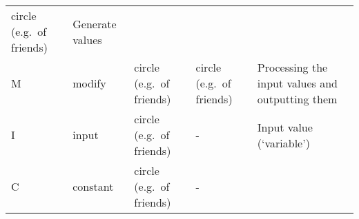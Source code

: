 \begin{longtable}[]{@{}lllll@{}}
\begin{minipage}[t]{0.17\columnwidth}
circle (e.g.~of friends)\strut
\end{minipage} & \begin{minipage}[t]{0.17\columnwidth}\raggedright
Generate values\strut
\end{minipage}\tabularnewline
\begin{minipage}[t]{0.17\columnwidth}\raggedright
M\strut
\end{minipage} & \begin{minipage}[t]{0.17\columnwidth}\raggedright
modify\strut
\end{minipage} & \begin{minipage}[t]{0.17\columnwidth}\raggedright
circle (e.g.~of friends)\strut
\end{minipage} & \begin{minipage}[t]{0.17\columnwidth}\raggedright
circle (e.g.~of friends)\strut
\end{minipage} & \begin{minipage}[t]{0.17\columnwidth}\raggedright
Processing the input values and outputting them\strut
\end{minipage}\tabularnewline
\begin{minipage}[t]{0.17\columnwidth}\raggedright
I\strut
\end{minipage} & \begin{minipage}[t]{0.17\columnwidth}\raggedright
input\strut
\end{minipage} & \begin{minipage}[t]{0.17\columnwidth}\raggedright
circle (e.g.~of friends)\strut
\end{minipage} & \begin{minipage}[t]{0.17\columnwidth}\raggedright
-\strut
\end{minipage} & \begin{minipage}[t]{0.17\columnwidth}\raggedright
Input value (`variable')\strut
\end{minipage}\tabularnewline
\begin{minipage}[t]{0.17\columnwidth}\raggedright
C\strut
\end{minipage} & \begin{minipage}[t]{0.17\columnwidth}\raggedright
constant\strut
\end{minipage} & \begin{minipage}[t]{0.17\columnwidth}\raggedright
circle (e.g.~of friends)\strut
\end{minipage} & \begin{minipage}[t]{0.17\columnwidth}\raggedright
-\strut
\end{minipage} & \begin{minipage}[t]{0.17\columnwidth}\raggedright

\end{minipage}
\end{longtable}
